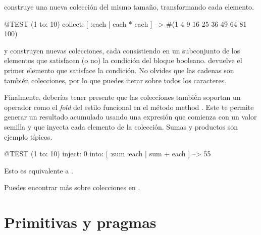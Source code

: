 \documentclass[a4paper,10pt,twoside]{book}
\begin{document}

 construye una nueva colecci\'on del mismo tama\~no, transformando cada elemento.
\begin{code}{@TEST}
(1 to: 10) collect: [ :each | each * each ] --> #(1 4 9 16 25 36 49 64 81 100)
\end{code}

 y  construyen nuevas colecciones, cada  consistiendo en un subconjunto de los elementos que satisfacen (o no) la condici\'on del bloque booleano.
 devuelve el primer elemento que satisface la condici\'on.
No olvides que las cadenas son tambi\'en colecciones, por lo que puedes iterar sobre todos los caracteres.


Finalmente, deber\'ias tener presente que las colecciones tambi\'en soportan un operador como el \emph{fold} del estilo funcional en el m\'etodo  method .
Este te  permite generar un resultado acumulado usando una expresi\'on que comienza con un valor semilla y que inyecta cada elemento de la colecci\'on.
Sumas y productos son ejemplo t\'ipicos.

\begin{code}{@TEST}
(1 to: 10) inject: 0 into: [ :sum :each | sum + each ] --> 55
\end{code}

\noindent
Esto es equivalente a .

Puedes encontrar m\'as sobre colecciones en  .

\section{Primitivas y pragmas}
\end{document}
